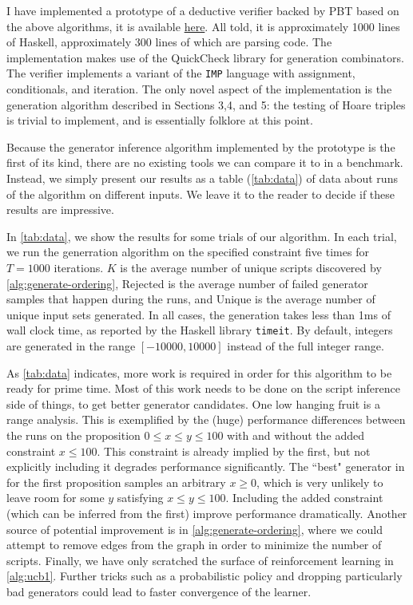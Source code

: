 \documentclass[10pt,a4paper]{article}
\begin{document}
I have implemented a prototype of a deductive verifier backed by PBT based on the above algorithms, it is available \href{https://github.com/jdublu10/triple-testing}{here}. All told, it is approximately 1000 lines of Haskell, approximately 300 lines of which are parsing code. The implementation makes use of the QuickCheck library \cite{qc} for generation combinators. The verifier implements a variant of the \texttt{IMP} language \cite{imp}
with assignment, conditionals, and iteration. The only novel aspect of the implementation is the generation algorithm described in Sections 3,4, and 5: the testing of Hoare triples is trivial to implement, and is essentially folklore at this point.

Because the generator inference algorithm implemented by the prototype is the first of its kind, there are no existing tools we can compare it to in a benchmark. Instead, we simply present our results as a table (\autoref{tab:data}) of data about runs of the algorithm on different inputs. We leave it to the reader to decide if these results are impressive.

In \autoref{tab:data}, we show the results for some trials of our algorithm. In each trial, we run the generration algorithm on the specified constraint five times for $T = 1000$ iterations. $K$ is the average number of unique scripts discovered by \autoref{alg:generate-ordering}, Rejected is the average number of failed generator samples that happen during the runs, and Unique is the average number of unique input sets generated. In all cases, the generation takes less than 1ms of wall clock time, as reported by the Haskell library \texttt{timeit}. By default, integers are generated in the range $[-10000,10000]$ instead of the full integer range.

As \autoref{tab:data} indicates, more work is required in order for this algorithm to be ready for prime time. Most of this work needs to be done on the script inference side of things, to get better generator candidates. One low hanging fruit is a range analysis. This is exemplified by the (huge) performance differences between the runs on the proposition $0 \leq x \leq y \leq 100$ with and without the added constraint $x \leq 100$. This constraint is already implied by the first, but not explicitly including it degrades performance significantly. The ``best" generator in for the first proposition samples an arbitrary $x \geq 0$, which is very unlikely to leave room for some $y$ satisfying $x \leq y \leq 100$. Including the added constraint (which can be inferred from the first) improve performance dramatically. Another source of potential improvement is in \autoref{alg:generate-ordering}, where we could attempt to remove edges from the graph in order to minimize the number of scripts. Finally, we have only scratched the surface of reinforcement learning in \autoref{alg:ucb1}. Further tricks such as a probabilistic policy and dropping particularly bad generators could lead to faster convergence of the learner.
\end{document}
